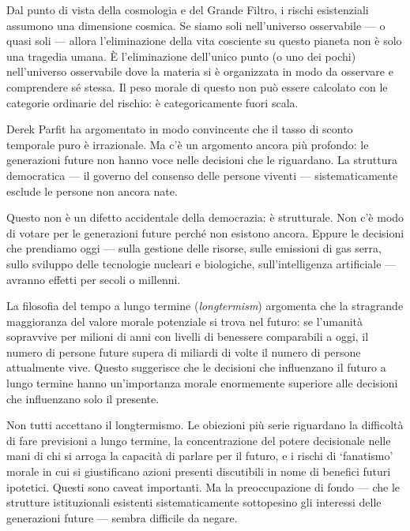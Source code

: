 \documentclass[12pt,a4paper,openany]{book}
\newcommand{\sezione}[1]{\vspace{1.2em}{\large\bfseries #1}\vspace{0.5em}\par}
\begin{document}
Dal punto di vista della cosmologia e del Grande Filtro, i rischi esistenziali assumono una dimensione cosmica. Se siamo soli nell'universo osservabile --- o quasi soli --- allora l'eliminazione della vita cosciente su questo pianeta non è solo una tragedia umana. È l'eliminazione dell'unico punto (o uno dei pochi) nell'universo osservabile dove la materia si è organizzata in modo da osservare e comprendere sé stessa. Il peso morale di questo non può essere calcolato con le categorie ordinarie del rischio: è categoricamente fuori scala.

\sezione{L'asimmetria del tempo e la responsabilità intergenerazionale}

Derek Parfit ha argomentato in modo convincente che il tasso di sconto temporale puro è irrazionale. Ma c'è un argomento ancora più profondo: le generazioni future non hanno voce nelle decisioni che le riguardano. La struttura democratica --- il governo del consenso delle persone viventi --- sistematicamente esclude le persone non ancora nate.

Questo non è un difetto accidentale della democrazia: è strutturale. Non c'è modo di votare per le generazioni future perché non esistono ancora. Eppure le decisioni che prendiamo oggi --- sulla gestione delle risorse, sulle emissioni di gas serra, sullo sviluppo delle tecnologie nucleari e biologiche, sull'intelligenza artificiale --- avranno effetti per secoli o millenni.

La filosofia del tempo a lungo termine (\textit{longtermism}) argomenta che la stragrande maggioranza del valore morale potenziale si trova nel futuro: se l'umanità sopravvive per milioni di anni con livelli di benessere comparabili a oggi, il numero di persone future supera di miliardi di volte il numero di persone attualmente vive. Questo suggerisce che le decisioni che influenzano il futuro a lungo termine hanno un'importanza morale enormemente superiore alle decisioni che influenzano solo il presente.

Non tutti accettano il longtermismo. Le obiezioni più serie riguardano la difficoltà di fare previsioni a lungo termine, la concentrazione del potere decisionale nelle mani di chi si arroga la capacità di parlare per il futuro, e i rischi di `fanatismo' morale in cui si giustificano azioni presenti discutibili in nome di benefici futuri ipotetici. Questi sono caveat importanti. Ma la preoccupazione di fondo --- che le strutture istituzionali esistenti sistematicamente sottopesino gli interessi delle generazioni future --- sembra difficile da negare.
\end{document}
